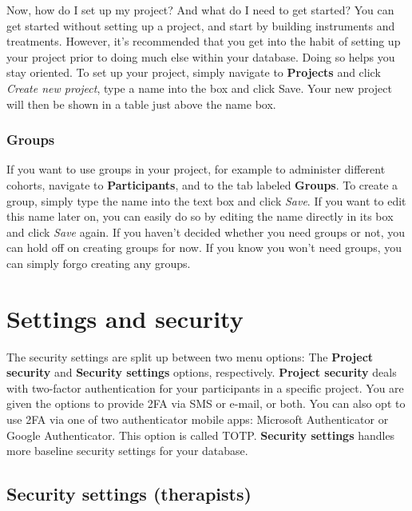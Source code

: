 \documentclass[]{book}
\begin{document}
Now, how do I set up my project? And what do I need to get started?
You can get started without setting up a project, and start by building instruments and treatments. However, it's recommended that you get into the habit of setting up your project prior to doing much else within your database. Doing so helps you stay oriented. To set up your project, simply navigate to \textbf{Projects} and click \emph{Create new project}, type a name into the box and click Save. Your new project will then be shown in a table just above the name box.

\hypertarget{groups}{%
\subsection{Groups}\label{groups}}

If you want to use groups in your project, for example to administer different cohorts, navigate to \textbf{Participants}, and to the tab labeled \textbf{Groups}. To create a group, simply type the name into the text box and click \emph{Save}. If you want to edit this name later on, you can easily do so by editing the name directly in its box and click \emph{Save} again.
If you haven't decided whether you need groups or not, you can hold off on creating groups for now. If you know you won't need groups, you can simply forgo creating any groups.

\hypertarget{settings-and-security}{%
\chapter{Settings and security}\label{settings-and-security}}

The security settings are split up between two menu options: The \textbf{Project security} and \textbf{Security settings} options, respectively. \textbf{Project security} deals with two-factor authentication for your participants in a specific project. You are given the options to provide 2FA via SMS or e-mail, or both. You can also opt to use 2FA via one of two authenticator mobile apps: Microsoft Authenticator or Google Authenticator. This option is called TOTP.
\textbf{Security settings} handles more baseline security settings for your database.

\hypertarget{security-settings-therapists}{%
\section{Security settings (therapists)}\label{security-settings-therapists}}
\end{document}
